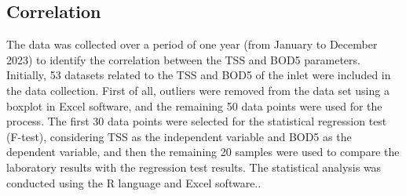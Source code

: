 \subsection{Correlation}
The data was collected over a period of one year (from January to December 2023) to identify the correlation between the \ac{TSS} and \ac{BOD5} parameters. Initially, 53 datasets related to the \ac{TSS} and \ac{BOD5} of the inlet were included in the data collection. First of all, outliers were removed from the data set using a boxplot in Excel software, and the remaining 50 data points were used for the process. The first 30 data points were selected for the statistical regression test (F-test), considering \ac{TSS} as the independent variable and \ac{BOD5} as the dependent variable, and then the remaining 20 samples were used to compare the laboratory results with the regression test results. The statistical analysis was conducted using the R language and Excel software.\cite{Kumar2010, Nikoonahad2016}.

 